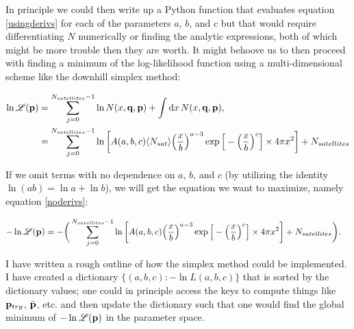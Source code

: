 In principle we could then write up a Python function that evaluates equation \eqref{usingderivs} for each of the parameters $a$, $b$, and $c$ but that would require differentiating $N$ numerically or finding the analytic expressions, both of which might be more trouble then they are worth. It might behoove us to then proceed with finding a minimum of the log-likelihood function using a multi-dimensional scheme like the downhill simplex method:

\begin{align}
\ln \mathcal{L}(\mathbf{p}) &= \sum_{j=0}^{N_{satellites} - 1} \ln N(x, \mathbf{q}, \mathbf{p}) + \int {\rm d} x \, N(x, \mathbf{q}, \mathbf{p}), \\
&= \sum_{j=0}^{N_{satellites} - 1} \ln \left[A(a,b,c) \langle N_{sat} \rangle \Big({x\over b}\Big)^{a-3} \exp\Big[-\Big({x\over b}\Big)^{c}\Big] \times 4\pi x^{2} \right] + N_{satellites}
\end{align}

If we omit terms with no dependence on $a$, $b$, and $c$ (by utilizing the identity $\ln(ab) = \ln a + \ln b$), we will get the equation we want to maximize, namely equation \eqref{noderivs}:

\begin{align}
\label{noderivs} -\ln \mathcal{L}(\mathbf{p}) &= -\bigg(\sum_{j=0}^{N_{satellites} - 1} \ln \left[A(a,b,c) \Big({x\over b}\Big)^{a-3} \exp\Big[-\Big({x\over b}\Big)^{c}\Big] \times 4\pi x^{2} \right] + N_{satellites}\bigg).
\end{align}

I have written a rough outline of how the simplex method could be implemented. I have created a dictionary $\{(a,b,c) : -\ln L(a,b,c)\}$ that is sorted by the dictionary values; one could in principle access the keys to compute things like $\mathbf{p}_{try}$, $\bar{\mathbf{p}}$, etc. and then update the dictionary such that one would find the global minimum of $-\ln \mathcal{L}(\mathbf{p})$ in the parameter space.



